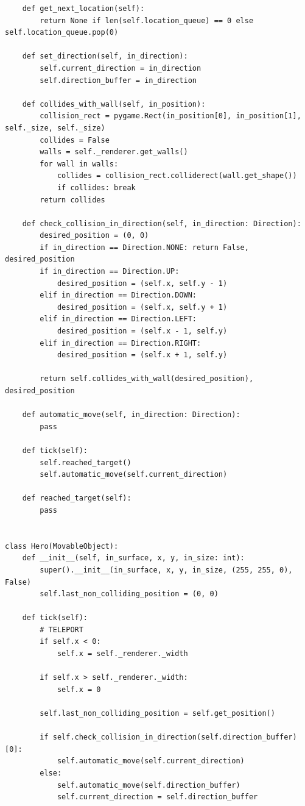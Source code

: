 \documentclass[a4paper,14pt]{extarticle}
\begin{document}
\begin{verbatim}
    def get_next_location(self):
        return None if len(self.location_queue) == 0 else self.location_queue.pop(0)

    def set_direction(self, in_direction):
        self.current_direction = in_direction
        self.direction_buffer = in_direction

    def collides_with_wall(self, in_position):
        collision_rect = pygame.Rect(in_position[0], in_position[1], self._size, self._size)
        collides = False
        walls = self._renderer.get_walls()
        for wall in walls:
            collides = collision_rect.colliderect(wall.get_shape())
            if collides: break
        return collides

    def check_collision_in_direction(self, in_direction: Direction):
        desired_position = (0, 0)
        if in_direction == Direction.NONE: return False, desired_position
        if in_direction == Direction.UP:
            desired_position = (self.x, self.y - 1)
        elif in_direction == Direction.DOWN:
            desired_position = (self.x, self.y + 1)
        elif in_direction == Direction.LEFT:
            desired_position = (self.x - 1, self.y)
        elif in_direction == Direction.RIGHT:
            desired_position = (self.x + 1, self.y)

        return self.collides_with_wall(desired_position), desired_position

    def automatic_move(self, in_direction: Direction):
        pass

    def tick(self):
        self.reached_target()
        self.automatic_move(self.current_direction)

    def reached_target(self):
        pass


class Hero(MovableObject):
    def __init__(self, in_surface, x, y, in_size: int):
        super().__init__(in_surface, x, y, in_size, (255, 255, 0), False)
        self.last_non_colliding_position = (0, 0)

    def tick(self):
        # TELEPORT
        if self.x < 0:
            self.x = self._renderer._width

        if self.x > self._renderer._width:
            self.x = 0

        self.last_non_colliding_position = self.get_position()

        if self.check_collision_in_direction(self.direction_buffer)[0]:
            self.automatic_move(self.current_direction)
        else:
            self.automatic_move(self.direction_buffer)
            self.current_direction = self.direction_buffer


\end{verbatim}
\end{document}
